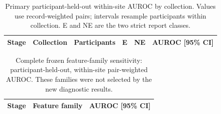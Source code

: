 \documentclass[10pt,twocolumn]{article}
\begin{document}
\begin{table}[h]
\centering
\caption{Primary participant-held-out within-site AUROC by collection. Values
use record-weighted pairs; intervals resample participants within collection.
E and NE are the two strict report classes.}
\label{tab:sites}
\small
\begin{tabular}{llrrrr}
\toprule
Stage & Collection & Participants & E & NE & AUROC [95\% CI] \\
\midrule

\end{tabular}
\end{table}

\begin{table}[h]
\centering
\caption{Complete frozen feature-family sensitivity: participant-held-out,
within-site pair-weighted AUROC. These families were not selected by the new
diagnostic results.}
\label{tab:secondary}
\small
\begin{tabular}{lll}
\toprule
Stage & Feature family & AUROC [95\% CI] \\
\midrule

\end{tabular}
\end{table}

\clearpage
\twocolumn
\balance


\end{document}
